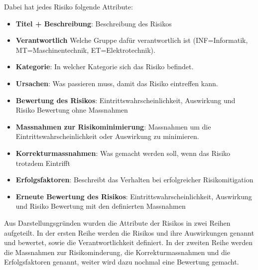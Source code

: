 \documentclass[../main.tex]{subfiles}
\begin{document}
Dabei hat jedes Risiko folgende Attribute:
\begin{itemize}
    \item \textbf{Titel + Beschreibung}: Beschreibung des Risikos
    \item \textbf{Verantwortlich} Welche Gruppe dafür verantwortlich ist (INF=Informatik, MT=Maschinentechnik, ET=Elektrotechnik).
    \item \textbf{Kategorie}: In welcher Kategorie sich das Risiko befindet.
    \item \textbf{Ursachen}: Was passieren muss, damit das Risiko eintreffen kann.
    \item \textbf{Bewertung des Risikos}: Eintrittswahrscheinlichkeit, Auswirkung und Risiko Bewertung ohne Massnahmen
    \item \textbf{Massnahmen zur Risikominimierung}: Massnahmen um die Eintrittswahrscheinlichkeit oder Auswirkung zu minimieren.
    \item \textbf{Korrekturmassnahmen}: Was gemacht werden soll, wenn das Risiko trotzdem Eintrifft
    \item \textbf{Erfolgsfaktoren}: Beschreibt das Verhalten bei erfolgreicher Risikomitigation
    \item \textbf{Erneute Bewertung des Risikos}: Eintrittswahrscheinlichkeit, Auswirkung und Risiko Bewertung mit den definierten Massnahmen
\end{itemize}

Aus Darstellungsgründen wurden die Attribute der Risikos in zwei Reihen aufgeteilt. In der ersten Reihe werden die Risikos und ihre Auswirkungen genannt und bewertet, sowie die Verantwortlichkeit definiert. In der zweiten Reihe werden die Massnahmen zur Risikominderung, die Korrekturmassnahmen und die Erfolgsfaktoren genannt, weiter wird dazu nochmal eine Bewertung gemacht.
\end{document}
